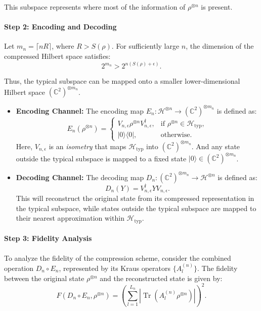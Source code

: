 This subspace represents where most of the information of \(\rho^{\otimes n}\) is present.

\paragraph{Step 2: Encoding and Decoding}

Let \(m_n = \lceil n R \rceil\), where \(R > S(\rho)\). For sufficiently large \(n\), the dimension of the compressed Hilbert space satisfies:
\[
2^{m_n} > 2^{n(S(\rho) + \epsilon)}.
\]

Thus, the typical subspace can be mapped onto a smaller lower-dimensional Hilbert space \((\mathbb{C}^2)^{\otimes m_n}\).

\begin{itemize}
    \item \textbf{Encoding Channel:}
    The encoding map \(E_n : \mathcal{H}^{\otimes n} \to (\mathbb{C}^2)^{\otimes m_n}\) is defined as:
    \[
    E_n(\rho^{\otimes n}) =
    \begin{cases}
        V_{n, \epsilon} \rho^{\otimes n} V_{n, \epsilon}^\dagger, & \text{if } \rho^{\otimes n} \in \mathcal{H}_{\text{typ}}, \\
        |0\rangle \langle 0|, & \text{otherwise}.
    \end{cases}
    \]
    Here, \(V_{n, \epsilon}\) is an \textit{isometry} that maps \(\mathcal{H}_{\text{typ}}\) into \((\mathbb{C}^2)^{\otimes m_n}\). And any state outside the typical subspace is mapped to a fixed state \(|0\rangle \in (\mathbb{C}^2)^{\otimes m_n}\).

    \item \textbf{Decoding Channel:}
    The decoding map \(D_n : (\mathbb{C}^2)^{\otimes m_n} \to \mathcal{H}^{\otimes n}\) is defined as:
    \[
    D_n(Y) = V_{n, \epsilon}^\dagger Y V_{n, \epsilon}.
    \]
This will reconstruct the original state from its compressed representation in the typical subspace, while states outside the typical subspace are mapped to their nearest approximation within  \(\mathcal{H}_{\text{typ}}\).
\end{itemize}

\paragraph{Step 3: Fidelity Analysis}

To analyze the fidelity of the compression scheme, consider the combined operation \(D_n \circ E_n\), represented by its Kraus operators \(\{A_l^{(n)}\}\). The fidelity between the original state \(\rho^{\otimes n}\) and the reconstructed state is given by:
\[
F(D_n \circ E_n, \rho^{\otimes n}) = \left( \sum_{l=1}^{L_n} \left| \operatorname{Tr}(A_l^{(n)} \rho^{\otimes n}) \right| \right)^2.
\]


